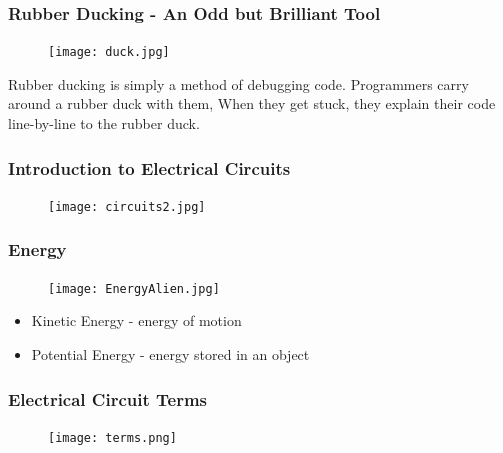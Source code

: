 \documentclass{beamer}
\begin{document}

\begin{frame}
\frametitle{Rubber Ducking - An Odd but Brilliant Tool}
\begin{figure}
\texttt{[image: duck.jpg]} 
\end{figure}

Rubber ducking is simply a method of debugging code. Programmers carry around a rubber duck with them, When they get stuck, they explain their code line-by-line to the rubber duck. 
\end{frame}

\begin{frame}
\frametitle{Introduction to Electrical Circuits}
\begin{figure}
\texttt{[image: circuits2.jpg]} 
\end{figure}
\end{frame}


\begin{frame}
\frametitle{Energy}
\begin{figure}
\texttt{[image: EnergyAlien.jpg]} 
\end{figure}
\begin{itemize} 
\item Kinetic Energy - energy of motion
\item Potential Energy - energy stored in an object
\end{itemize}
\end{frame}

\begin{frame}\frametitle{Electrical Circuit Terms}
\begin{figure}
\texttt{[image: terms.png]} 
\end{figure}
\end{frame}
\end{document}
